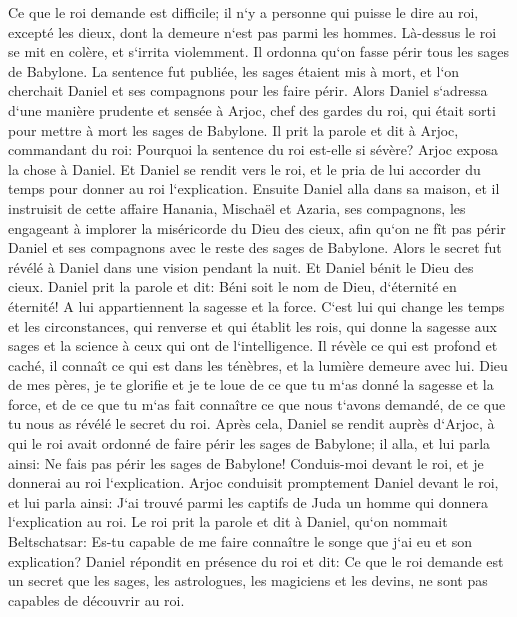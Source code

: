 \verse Ce que le roi demande est difficile; il n`y a personne qui puisse le dire au roi, excepté les dieux, dont la demeure n`est pas parmi les hommes. 
\verse Là-dessus le roi se mit en colère, et s`irrita violemment. Il ordonna qu`on fasse périr tous les sages de Babylone. 
\verse La sentence fut publiée, les sages étaient mis à mort, et l`on cherchait Daniel et ses compagnons pour les faire périr. 
\verse Alors Daniel s`adressa d`une manière prudente et sensée à Arjoc, chef des gardes du roi, qui était sorti pour mettre à mort les sages de Babylone. 
\verse Il prit la parole et dit à Arjoc, commandant du roi: Pourquoi la sentence du roi est-elle si sévère? Arjoc exposa la chose à Daniel. 
\verse Et Daniel se rendit vers le roi, et le pria de lui accorder du temps pour donner au roi l`explication. 
\verse Ensuite Daniel alla dans sa maison, et il instruisit de cette affaire Hanania, Mischaël et Azaria, ses compagnons, 
\verse les engageant à implorer la miséricorde du Dieu des cieux, afin qu`on ne fît pas périr Daniel et ses compagnons avec le reste des sages de Babylone. 
\verse Alors le secret fut révélé à Daniel dans une vision pendant la nuit. Et Daniel bénit le Dieu des cieux. 
\verse Daniel prit la parole et dit: Béni soit le nom de Dieu, d`éternité en éternité! A lui appartiennent la sagesse et la force. 
\verse C`est lui qui change les temps et les circonstances, qui renverse et qui établit les rois, qui donne la sagesse aux sages et la science à ceux qui ont de l`intelligence. 
\verse Il révèle ce qui est profond et caché, il connaît ce qui est dans les ténèbres, et la lumière demeure avec lui. 
\verse Dieu de mes pères, je te glorifie et je te loue de ce que tu m`as donné la sagesse et la force, et de ce que tu m`as fait connaître ce que nous t`avons demandé, de ce que tu nous as révélé le secret du roi. 
\verse Après cela, Daniel se rendit auprès d`Arjoc, à qui le roi avait ordonné de faire périr les sages de Babylone; il alla, et lui parla ainsi: Ne fais pas périr les sages de Babylone! Conduis-moi devant le roi, et je donnerai au roi l`explication. 
\verse Arjoc conduisit promptement Daniel devant le roi, et lui parla ainsi: J`ai trouvé parmi les captifs de Juda un homme qui donnera l`explication au roi. 
\verse Le roi prit la parole et dit à Daniel, qu`on nommait Beltschatsar: Es-tu capable de me faire connaître le songe que j`ai eu et son explication? 
\verse Daniel répondit en présence du roi et dit: Ce que le roi demande est un secret que les sages, les astrologues, les magiciens et les devins, ne sont pas capables de découvrir au roi. 
